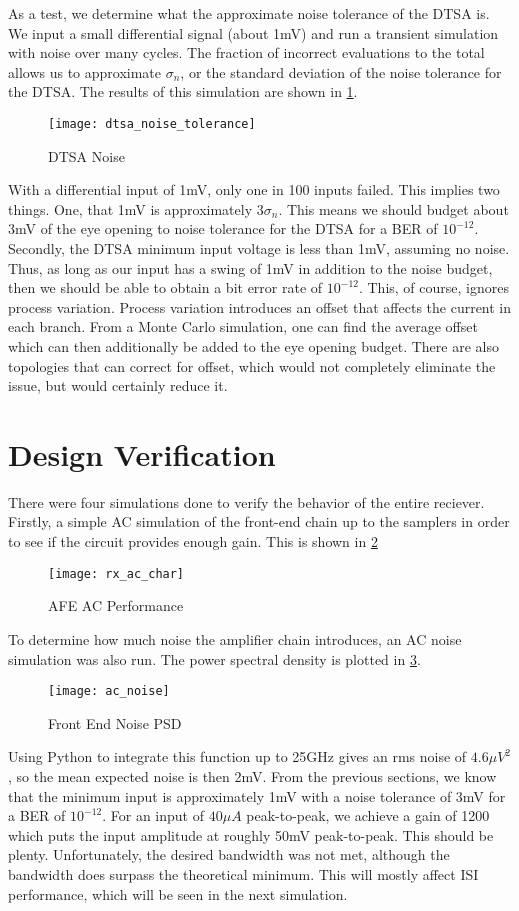 As a test, we determine what the approximate noise tolerance of the DTSA is. We input a small differential signal (about 1mV) and run a transient simulation with noise over many cycles. The fraction of incorrect evaluations to the total allows us to approximate $\sigma_n$, or the standard deviation of the noise tolerance for the DTSA. The results of this simulation are shown in \ref{fig:dtsa_noise}.
\begin{figure}[h]
\centering
\texttt{[image: dtsa\_noise\_tolerance]}
\caption{DTSA Noise}
\label{fig:dtsa_noise}
\end{figure}
With a differential input of 1mV, only one in 100 inputs failed. This implies two things. One, that 1mV is approximately $3\sigma_n$. This means we should budget about 3mV of the eye opening to noise tolerance for the DTSA for a BER of $10^{-12}$. Secondly, the DTSA minimum input voltage is less than 1mV, assuming no noise. Thus, as long as our input has a swing of 1mV in addition to the noise budget, then we should be able to obtain a bit error rate of $10^{-12}$. This, of course, ignores process variation. Process variation introduces an offset that affects the current in each branch. From a Monte Carlo simulation, one can find the average offset which can then additionally be added to the eye opening budget. There are also topologies that can correct for offset, which would not completely eliminate the issue, but would certainly reduce it.
\clearpage
\section{Design Verification}
There were four simulations done to verify the behavior of the entire reciever. Firstly, a simple AC simulation of the front-end chain up to the samplers in order to see if the circuit provides enough gain. This is shown in \ref{fig:afe_ac}
\begin{figure}[h]
\centering
\texttt{[image: rx\_ac\_char]}
\caption{AFE AC Performance}
\label{fig:afe_ac}
\end{figure}
\clearpage
To determine how much noise the amplifier chain introduces, an AC noise simulation was also run. The power spectral density is plotted in \ref{fig:psd}.
\begin{figure}[h]
\centering
\texttt{[image: ac\_noise]}
\caption{Front End Noise PSD}
\label{fig:psd}
\end{figure}

Using Python to integrate this function up to 25GHz gives an rms noise of $4.6\mu V^2$, so the mean expected noise is then 2mV.
\clearpage
From the previous sections, we know that the minimum input is approximately 1mV with a noise tolerance of 3mV for a BER of $10^{-12}$. For an input of $40\mu A$ peak-to-peak, we achieve a gain of 1200 which puts the input amplitude at roughly 50mV peak-to-peak. This should be plenty. Unfortunately, the desired bandwidth was not met, although the bandwidth does surpass the theoretical minimum. This will mostly affect ISI performance, which will be seen in the next simulation.

